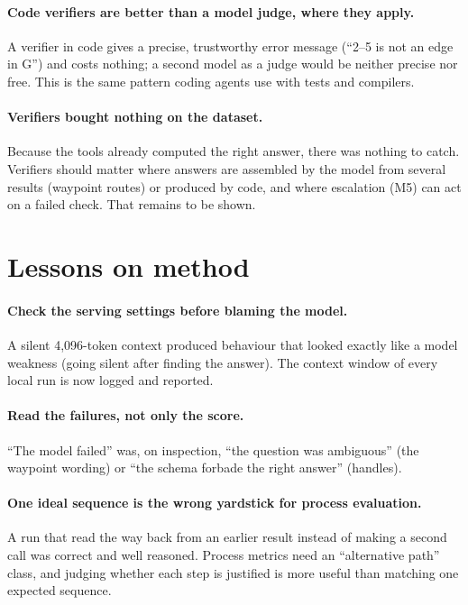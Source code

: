 \paragraph{Code verifiers are better than a model judge, where they apply.} A verifier in code gives a precise,
trustworthy error message (``2--5 is not an edge in G'') and costs nothing; a second model as a judge would be
neither precise nor free. This is the same pattern coding agents use with tests and compilers.

\paragraph{Verifiers bought nothing on the dataset.} Because the tools already computed the right answer, there was
nothing to catch. Verifiers should matter where answers are assembled by the model from several results (waypoint
routes) or produced by code, and where escalation (M5) can act on a failed check. That remains to be shown.

\section{Lessons on method}

\paragraph{Check the serving settings before blaming the model.} A silent 4,096-token context produced behaviour that
looked exactly like a model weakness (going silent after finding the answer). The context window of every local run
is now logged and reported.

\paragraph{Read the failures, not only the score.} ``The model failed'' was, on inspection, ``the question was
ambiguous'' (the waypoint wording) or ``the schema forbade the right answer'' (handles).

\paragraph{One ideal sequence is the wrong yardstick for process evaluation.} A run that read the way back from an
earlier result instead of making a second call was correct and well reasoned. Process metrics need an ``alternative
path'' class, and judging whether each step is justified is more useful than matching one expected sequence.

